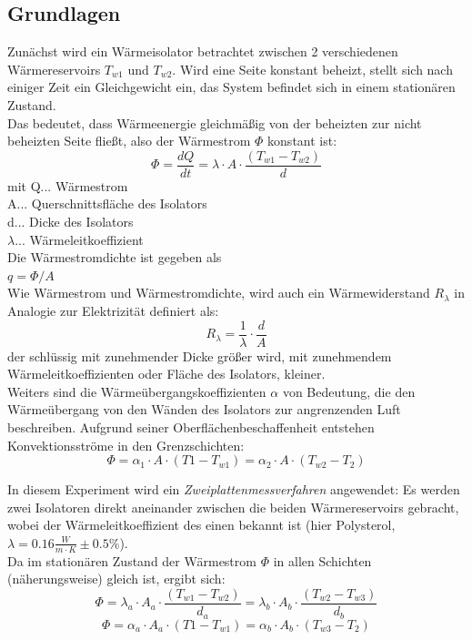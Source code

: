 \documentclass[12pt,a4paper]{article}
\begin{document}
\begin{multicols}{2}
\subsection{Grundlagen}
Zunächst wird ein Wärmeisolator betrachtet zwischen 2 verschiedenen Wärmereservoirs $T_{w1}$ und $T_{w2}$. Wird eine Seite konstant beheizt, stellt sich nach einiger Zeit ein Gleichgewicht ein, das System befindet sich in einem stationären Zustand.\\
Das bedeutet, dass Wärmeenergie gleichmäßig von der beheizten zur nicht beheizten Seite fließt, also der Wärmestrom $\Phi$ konstant ist:
$$\Phi=\frac{dQ}{dt}=\lambda \cdot A \cdot \frac{(T_{w1}-T_{w2})}{d}$$
mit Q... Wärmestrom\\
A... Querschnittsfläche des Isolators\\
d... Dicke des Isolators\\
$\lambda$... Wärmeleitkoeffizient\\
Die Wärmestromdichte ist gegeben als\\
$q=\Phi/A$\\
Wie Wärmestrom und Wärmestromdichte, wird auch ein Wärmewiderstand $R_{\lambda}$ in Analogie zur Elektrizität definiert als:
$$R_{\lambda}=\frac{1}{\lambda}\cdot \frac{d}{A} $$
der schlüssig mit zunehmender Dicke größer wird, mit zunehmendem Wärmeleitkoeffizienten oder Fläche des Isolators, kleiner.\\
Weiters sind die Wärmeübergangskoeffizienten $\alpha$ von Bedeutung, die den Wärmeübergang von den Wänden des Isolators zur angrenzenden Luft beschreiben. Aufgrund seiner Oberflächenbeschaffenheit entstehen Konvektionsströme in den Grenzschichten:
$$\Phi = \alpha_1 \cdot A \cdot (T1-T_{w1}) = \alpha_2 \cdot A \cdot (T_{w2}-T_2) $$

\noindent In diesem Experiment wird ein \emph{Zweiplattenmessverfahren} angewendet: Es werden zwei Isolatoren direkt aneinander zwischen die beiden Wärmereservoirs gebracht, wobei der Wärmeleitkoeffizient des einen bekannt ist (hier Polysterol, $\lambda = 0.16 \frac{W}{m \cdot K}\pm 0.5\%$).\\
Da im stationären Zustand der Wärmestrom $\Phi$ in allen Schichten (näherungsweise) gleich ist, ergibt sich:
$$\Phi=\lambda_a \cdot A_a \cdot \frac{(T_{w1}-T_{w2})}{d_a}=\lambda_b \cdot A_b \cdot \frac{(T_{w2}-T_{w3})}{d_b}$$
$$\Phi = \alpha_a \cdot A_a \cdot (T1-T_{w1}) = \alpha_b \cdot A_b \cdot (T_{w3}-T_2) $$



\end{multicols}
\end{document}
